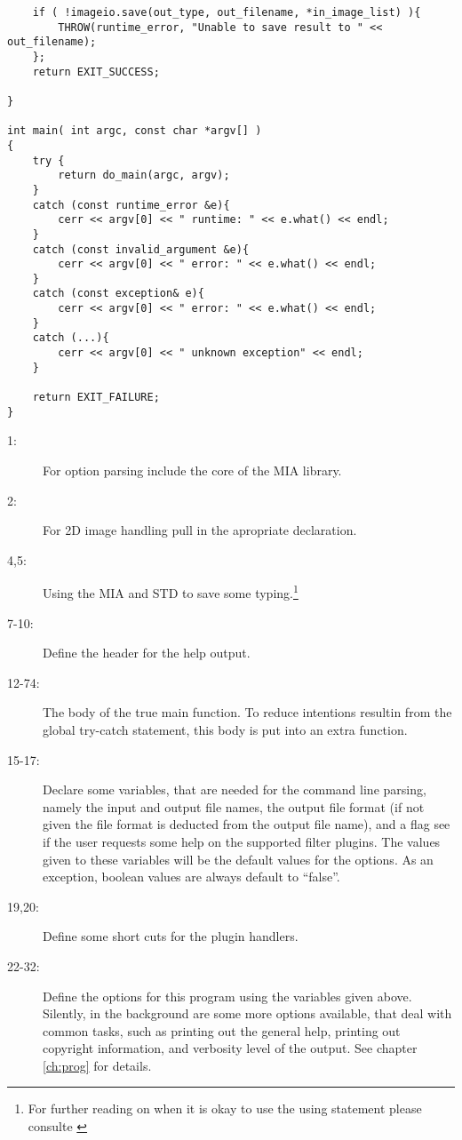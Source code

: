\documentclass[english, 10pt, a4paper,headsepline,openany]{scrbook}
\begin{document}
\begin{lstlisting}
	if ( !imageio.save(out_type, out_filename, *in_image_list) ){
		THROW(runtime_error, "Unable to save result to " << out_filename);
	};
	return EXIT_SUCCESS;

}

int main( int argc, const char *argv[] )
{
	try {
		return do_main(argc, argv);
	}
	catch (const runtime_error &e){
		cerr << argv[0] << " runtime: " << e.what() << endl;
	}
	catch (const invalid_argument &e){
		cerr << argv[0] << " error: " << e.what() << endl;
	}
	catch (const exception& e){
		cerr << argv[0] << " error: " << e.what() << endl;
	}
	catch (...){
		cerr << argv[0] << " unknown exception" << endl;
	}

	return EXIT_FAILURE;
}
\end{lstlisting}  

\begin{description}
\item [1:] For option parsing include the core of the MIA library. 
\item [2:] For 2D image handling pull in the apropriate declaration. 
\item [4,5:] Using the MIA and STD to save some typing.\footnote{%
For further reading on when it is okay to use the using statement please consulte \citet{sutter05coding}}
\item [7-10:] Define the header for the help output. 
\item [12-74:] The body of the true main function. 
    To reduce intentions resultin from the global try-catch statement, this body is put into an extra function. 
\item [15-17:]
    Declare some variables, that are needed for the command line parsing, namely the input and output file names, 
    the output file format (if not given the file format is deducted from the output file name), and a flag 
    see if the user requests some help on the supported filter plugins. 
    The values given to these variables will be the default values for the options. 
     As an exception, boolean values are always default to ``false''. 
\item [19,20:] Define some short cuts for the plugin handlers.
\item [22-32:] Define the options for this program using the variables given above. 
    Silently, in the background are some more options available, that deal with common tasks, such as printing out the general
      help, printing out copyright information, and verbosity level of the output. 
    See chapter \ref{ch:prog} for details. 

\end{description}
\end{document}
